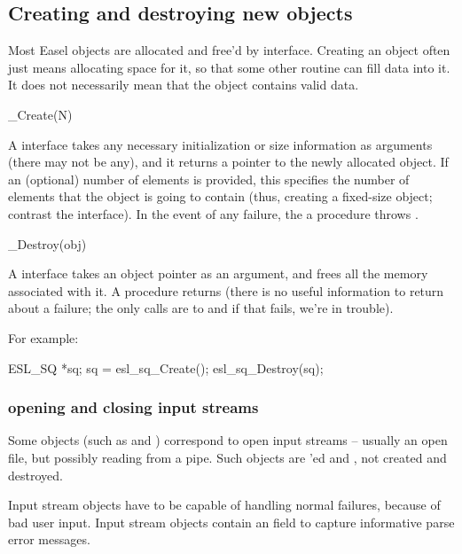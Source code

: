 \subsection{Creating and destroying new objects}

Most Easel objects are allocated and free'd by
 interface. Creating an object often
just means allocating space for it, so that some other routine can
fill data into it. It does not necessarily mean that the object
contains valid data.

\begin{sreapi}
\hypertarget{ifc:Create} 
{\item[\_Create(N)]}

A  interface takes any necessary initialization or
size information as arguments (there may not be any), and it returns a
pointer to the newly allocated object. If an (optional) number of
elements  is provided, this specifies the number of elements
that the object is going to contain (thus, creating a fixed-size
object; contrast the  interface).  In the
event of any failure, the a  procedure throws
.

\hypertarget{ifc:Destroy} 
{\item[\_Destroy(obj)]}
A  interface takes an object pointer as an
argument, and frees all the memory associated with it. A
 procedure returns  (there is no useful
information to return about a failure; the only calls are to 
 and if that fails, we're in trouble).
\end{sreapi}

For example:
\begin{cchunk}
   ESL_SQ *sq;
   sq = esl_sq_Create();
   esl_sq_Destroy(sq);
\end{cchunk}

  \subsubsection{opening and closing input streams}

Some objects (such as  and )
correspond to open input streams -- usually an open file, but possibly
reading from a pipe. Such objects are 'ed and
, not created and destroyed.

Input stream objects have to be capable of handling normal failures,
because of bad user input. Input stream objects contain an
 field to capture informative parse error
messages. 

